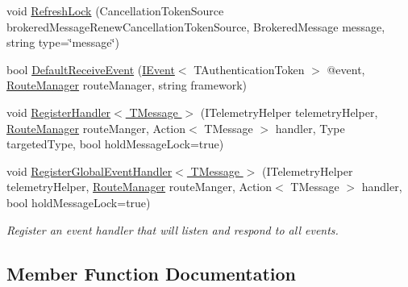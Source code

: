 \begin{DoxyCompactItemize}
\item 
void \hyperlink{interfaceCqrs_1_1Azure_1_1ServiceBus_1_1IAzureBusHelper_a51988703dad9dc41c834e620e4e6e31a_a51988703dad9dc41c834e620e4e6e31a}{Refresh\+Lock} (Cancellation\+Token\+Source brokered\+Message\+Renew\+Cancellation\+Token\+Source, Brokered\+Message message, string type=\char`\"{}message\char`\"{})
\item 
bool \hyperlink{interfaceCqrs_1_1Azure_1_1ServiceBus_1_1IAzureBusHelper_a29758e82b2fd6c7e3ed6b19547887db9_a29758e82b2fd6c7e3ed6b19547887db9}{Default\+Receive\+Event} (\hyperlink{interfaceCqrs_1_1Events_1_1IEvent}{I\+Event}$<$ T\+Authentication\+Token $>$ @event, \hyperlink{classCqrs_1_1Bus_1_1RouteManager}{Route\+Manager} route\+Manager, string framework)
\item 
void \hyperlink{interfaceCqrs_1_1Azure_1_1ServiceBus_1_1IAzureBusHelper_a1fe0ff74b4e5cce3d0b5a81dbaa273e0_a1fe0ff74b4e5cce3d0b5a81dbaa273e0}{Register\+Handler$<$ T\+Message $>$} (I\+Telemetry\+Helper telemetry\+Helper, \hyperlink{classCqrs_1_1Bus_1_1RouteManager}{Route\+Manager} route\+Manger, Action$<$ T\+Message $>$ handler, Type targeted\+Type, bool hold\+Message\+Lock=true)
\item 
void \hyperlink{interfaceCqrs_1_1Azure_1_1ServiceBus_1_1IAzureBusHelper_aef39e7d297ccaa36b02ccc3012dc5906_aef39e7d297ccaa36b02ccc3012dc5906}{Register\+Global\+Event\+Handler$<$ T\+Message $>$} (I\+Telemetry\+Helper telemetry\+Helper, \hyperlink{classCqrs_1_1Bus_1_1RouteManager}{Route\+Manager} route\+Manger, Action$<$ T\+Message $>$ handler, bool hold\+Message\+Lock=true)
\begin{DoxyCompactList}\small\item\em Register an event handler that will listen and respond to all events. \end{DoxyCompactList}\end{DoxyCompactItemize}


\subsection{Member Function Documentation}
\mbox{\label{interfaceCqrs_1_1Azure_1_1ServiceBus_1_1IAzureBusHelper_a3c632e92e0e38110f9e7721fb31700d1_a3c632e92e0e38110f9e7721fb31700d1}} 
